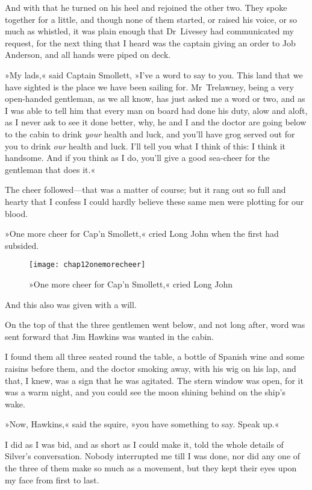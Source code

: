 And with that he turned on his heel and rejoined the other two. They spoke together for a little, and though none of them started, or raised his voice, or so much as whistled, it was plain enough that Dr~Livesey had communicated my request, for the next thing that I heard was the captain giving an order to Job Anderson, and all hands were piped on deck.

»My lads,« said Captain Smollett, »I've a word to say to you. This land that we have sighted is the place we have been sailing for. Mr~Trelawney, being a very open-handed gentleman, as we all know, has just asked me a word or two, and as I was able to tell him that every man on board had done his duty, alow and aloft, as I never ask to see it done better, why, he and I and the doctor are going below to the cabin to drink \textit{your} health and luck, and you'll have grog served out for you to drink \textit{our} health and luck. I'll tell you what I think of this: I think it handsome. And if you think as I do, you'll give a good sea-cheer for the gentleman that does it.«

The cheer followed—that was a matter of course; but it rang out so full and hearty that I confess I could hardly believe these same men were plotting for our blood.

»One more cheer for Cap'n Smollett,« cried Long John when the first had subsided.

 \begin{sidewaysfigure}
\texttt{[image: chap12onemorecheer]}%
\caption{»One more cheer for Cap'n Smollett,« cried Long John}
\end{sidewaysfigure} 

And this also was given with a will.

On the top of that the three gentlemen went below, and not long after, word was sent forward that Jim Hawkins was wanted in the cabin.

I found them all three seated round the table, a bottle of Spanish wine and some raisins before them, and the doctor smoking away, with his wig on his lap, and that, I knew, was a sign that he was agitated. The stern window was open, for it was a warm night, and you could see the moon shining behind on the ship's wake.

»Now, Hawkins,« said the squire, »you have something to say. Speak up.«

I did as I was bid, and as short as I could make it, told the whole details of Silver's conversation. Nobody interrupted me till I was done, nor did any one of the three of them make so much as a movement, but they kept their eyes upon my face from first to last.

